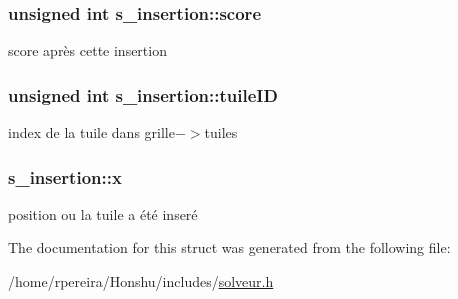 \subsubsection[{\texorpdfstring{score}{score}}]{\setlength{\rightskip}{0pt plus 5cm}unsigned int s\+\_\+insertion\+::score}\hypertarget{structs__insertion_a534ff82edef3df4a52b6ee6f59fd866b}{}\label{structs__insertion_a534ff82edef3df4a52b6ee6f59fd866b}
score après cette insertion 
\subsubsection[{\texorpdfstring{tuile\+ID}{tuileID}}]{\setlength{\rightskip}{0pt plus 5cm}unsigned int s\+\_\+insertion\+::tuile\+ID}\hypertarget{structs__insertion_a59dd0b9632c6ed17d078efefd382f58c}{}\label{structs__insertion_a59dd0b9632c6ed17d078efefd382f58c}
index de la tuile dans \textquotesingle{}grille−$>$tuiles\textquotesingle{} 
\subsubsection[{\texorpdfstring{x}{x}}]{ s\+\_\+insertion\+::x}\hypertarget{structs__insertion_a71a3277392383e4150d923352b820255}{}\label{structs__insertion_a71a3277392383e4150d923352b820255}
position ou la tuile a été inseré 

The documentation for this struct was generated from the following file\+:\begin{DoxyCompactItemize}
\item 
/home/rpereira/\+Honshu/includes/\hyperlink{solveur_8h}{solveur.\+h}\end{DoxyCompactItemize}
